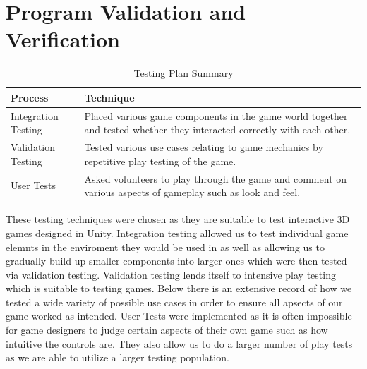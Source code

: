 \documentclass[11pt,a4paper]{article}
\begin{document}
\section{Program Validation and Verification}

\begin{table}[H]
\caption{Testing Plan Summary}
	\begin{center}
		\begin{tabular}{ |l|p{10cm}| } 
			\hline
			Process & Technique \\ \hline
			Integration Testing & Placed various game components in the game world together and tested whether they interacted correctly with each other. \\ \hline
			Validation Testing & Tested various use cases relating to game mechanics by repetitive play testing of the game. \\ \hline
			User Tests & Asked volunteers to play through the game and comment on various aspects of gameplay such as look and feel.\\
			\hline
		\end{tabular}
	\end{center}
\end{table}
These testing techniques were chosen as they are suitable to test interactive 3D games designed in Unity. Integration testing allowed us to test individual game elemnts in the enviroment they would be used in as well as allowing us to gradually build up smaller components into larger ones which were then tested via validation testing. Validation testing lends itself to intensive play testing which is suitable to testing games. Below there is an extensive record of how we tested a wide variety of possible use cases in order to ensure all apsects of our game worked as intended. User Tests were implemented as it is often impossible for game designers to judge certain aspects of their own game such as how intuitive the controls are. They also allow us to do a larger number of play tests as we are able to utilize a larger testing population.
\end{document}

